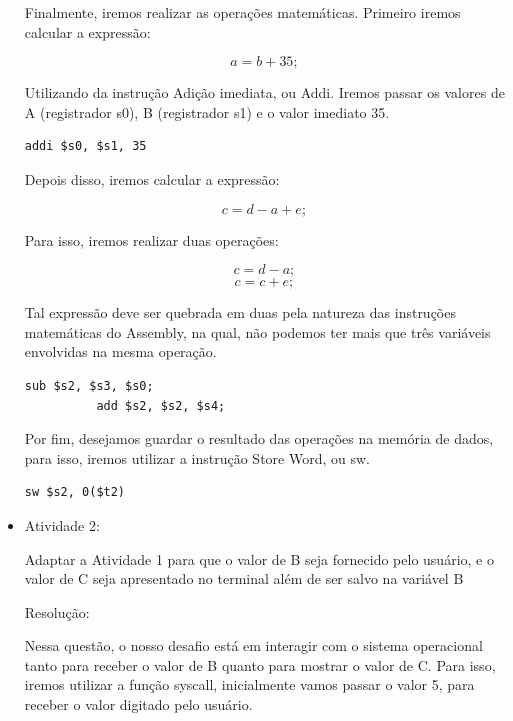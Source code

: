 \documentclass{report}
\begin{document}
\begin{itemize}
\large

Finalmente, iremos realizar as operações matemáticas. Primeiro
iremos calcular a expressão:

$$ a = b + 35; $$ 

Utilizando da instrução Adição imediata, ou Addi. Iremos passar
os valores de A (registrador s0), B (registrador s1) e o valor
imediato 35.

\normalsize
\bigskip

\begin{lstlisting}[language=Ant]
                addi $s0, $s1, 35
\end{lstlisting}


\large

Depois disso, iremos calcular a expressão:

$$ c = d - a + e; $$ 

Para isso, iremos realizar duas operações:

$$ c = d - a; $$ 
$$ c = c + e; $$ 

Tal expressão deve ser quebrada em duas pela natureza
das instruções matemáticas do Assembly, na qual, não
podemos ter mais que três variáveis envolvidas na mesma
operação.

\normalsize
\bigskip

\begin{lstlisting}[language=Ant]
          sub $s2, $s3, $s0;
          add $s2, $s2, $s4;
\end{lstlisting}


\large

Por fim, desejamos guardar o resultado das operações na
memória de dados, para isso, iremos utilizar a instrução
Store Word, ou sw.


\normalsize
\bigskip

\begin{lstlisting}[language=Ant]
		sw $s2, 0($t2)
\end{lstlisting}

\large


   \item Atividade 2:

     Adaptar a Atividade 1 para que o valor de B seja fornecido
     pelo usuário, e o valor de C seja apresentado no terminal
     além de ser salvo na variável B
  
  \bigskip
  Resolução:
  \bigskip
  
  Nessa questão, o nosso desafio está em interagir com o sistema
  operacional tanto para receber o valor de B quanto para mostrar
  o valor de C. Para isso, iremos utilizar a função syscall,
  inicialmente vamos passar o valor 5, para receber o valor digitado
  pelo usuário.



\end{itemize}
\end{document}
